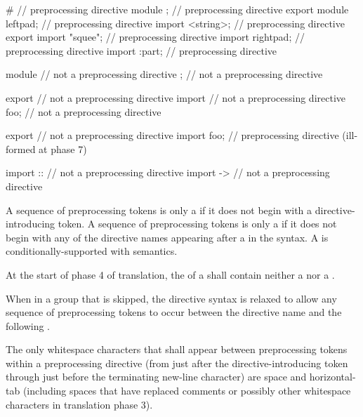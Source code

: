 \documentclass{wg21}
\newcommand{\clb}[1]{\removed{#1} \added{\grammarterm{line-break}}}
\begin{document}
\begin{example}
    \begin{codeblock}
        #                       // preprocessing directive
        module ;                // preprocessing directive
        export module leftpad;  // preprocessing directive
        import <string>;        // preprocessing directive
        export import "squee";  // preprocessing directive
        import rightpad;        // preprocessing directive
        import :part;           // preprocessing directive

        module                  // not a preprocessing directive
        ;                       // not a preprocessing directive

        export                  // not a preprocessing directive
        import                  // not a preprocessing directive
        foo;                    // not a preprocessing directive

        export                  // not a preprocessing directive
        import foo;             // preprocessing directive (ill-formed at phase 7)

        import ::               // not a preprocessing directive
        import ->               // not a preprocessing directive
    \end{codeblock}
\end{example}

\pnum
A sequence of preprocessing tokens is only a 
if it does not begin with a directive-introducing token.
A sequence of preprocessing tokens is only a 
if it does not begin with any of the directive names
appearing after a \tcode{\#} in the syntax.
A  is
conditionally-supported with
semantics.

\pnum
At the start of phase 4 of translation,
the  of a  shall
contain neither a  nor a .

\pnum
When in a group that is skipped, the directive
syntax is relaxed to allow any sequence of preprocessing tokens to occur between
the directive name and the following \clb{new-line character}.

\pnum
\begin{removedblock}
The only whitespace characters that shall appear
between preprocessing tokens
within a preprocessing directive
(from just after the directive-introducing token
through just before the terminating new-line character)
are space and horizontal-tab
(including spaces that have replaced comments
or possibly other whitespace characters
in translation phase 3).
\end{removedblock}
\end{document}
